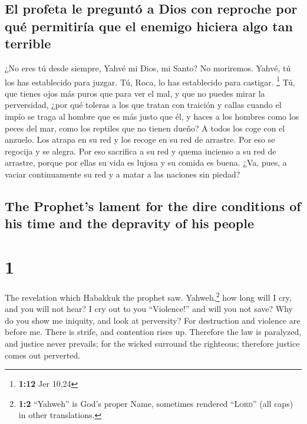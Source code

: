\begin{paracol}{2}
\hypertarget{el-profeta-le-preguntuxf3-a-dios-con-reproche-por-quuxe9-permitiruxeda-que-el-enemigo-hiciera-algo-tan-terrible}{%
\subsection{El profeta le preguntó a Dios con reproche por qué
permitiría que el enemigo hiciera algo tan
terrible}\label{el-profeta-le-preguntuxf3-a-dios-con-reproche-por-quuxe9-permitiruxeda-que-el-enemigo-hiciera-algo-tan-terrible}}

 ¿No eres tú desde siempre, Yahvé mi Dios, mi Santo? No
moriremos. Yahvé, tú los has establecido para juzgar. Tú, Roca, lo has
establecido para castigar. \footnote{\textbf{1:12} Jer 10,24}
 Tú, que tienes ojos más puros que para ver el mal, y que
no puedes mirar la perversidad, ¿por qué toleras a los que tratan con
traición y callas cuando el impío se traga al hombre que es más justo
que él,  y haces a los hombres como los peces del mar,
como los reptiles que no tienen dueño?  A todos los coge
con el anzuelo. Los atrapa en su red y los recoge en su red de arrastre.
Por eso se regocija y se alegra.  Por eso sacrifica a su
red y quema incienso a su red de arrastre, porque por ellas su vida es
lujosa y su comida es buena.  ¿Va, pues, a vaciar
continuamente su red y a matar a las naciones sin piedad?

\switchcolumn
\begin{otherlanguage}{english}

\hypertarget{the-prophets-lament-for-the-dire-conditions-of-his-time-and-the-depravity-of-his-people}{%
\subsection{The Prophet's lament for the dire conditions of his time and
the depravity of his
people}\label{the-prophets-lament-for-the-dire-conditions-of-his-time-and-the-depravity-of-his-people}}

\hypertarget{section-1}{%
\section{1}\label{section-1}}

 The revelation which Habakkuk the prophet saw.
 Yahweh,\footnote{\textbf{1:2} ``Yahweh'' is God's proper
  Name, sometimes rendered ``\textsc{Lord}'' (all caps) in other
  translations.} how long will I cry, and you will not hear? I cry out
to you ``Violence!'' and will you not save?  Why do you
show me iniquity, and look at perversity? For destruction and violence
are before me. There is strife, and contention rises up. 
Therefore the law is paralyzed, and justice never prevails; for the
wicked surround the righteous; therefore justice comes out perverted.


\end{otherlanguage}
\end{paracol}
